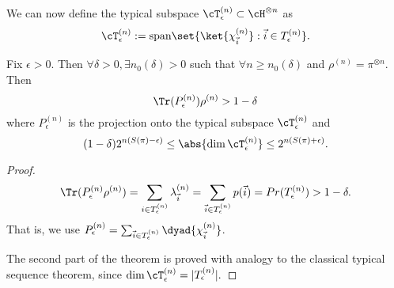 We can now define the typical subspace $\cT_\epsilon^{(n)}\subset \cH^{\otimes n}$ as
\begin{equation}
    \cT_\epsilon^{(n)} := \text{span}\set{\ket{\chi_{\vec i}^{(n)}} : \vec i \in T_\epsilon^{(n)}}.
\end{equation}

\begin{thm}
    Fix $\epsilon>0$. Then $\forall \delta >0, \exists n_0(\delta) >0$ such that $\forall n \geq n_0(\delta)$ and $\rho^{(n)}=\pi^{\otimes n}$. Then
    \begin{equation}
        \Tr(P_\epsilon^{(n)}) \rho^{(n)} > 1-\delta
    \end{equation}
    where $P_\epsilon^{(n)}$ is the projection onto the typical subspace $\cT_\epsilon^{(n)}$ and
    \begin{equation}
        (1-\delta) 2^{n(S(\pi)-\epsilon)}\leq \abs{\dim \cT_\epsilon^{(n)}} \leq 2^{n(S(\pi)+\epsilon)}.
    \end{equation}
\end{thm}
\begin{proof}
\begin{equation}
    \Tr(P_\epsilon^{(n)} \rho^{(n)}) = \sum_{i\in T_\epsilon^{(n)}} \lambda_{\vec i}^{(n)} =\sum_{\vec i \in T_\epsilon^{(n)}} p({\vec i}) = Pr(T_\epsilon^{(n)})>1-\delta.
\end{equation}
That is, we use $P_\epsilon^{(n)} = \sum_{\vec i\in T_\epsilon^{(n)}}\dyad{\chi_{\vec i}^{(n)}}$.

The second part of the theorem is proved with analogy to the classical typical sequence theorem, since $\dim \cT_\epsilon^{(n)}=|T_\epsilon^{(n)}|.$
\end{proof}

